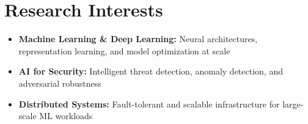 \documentclass[a4paper,10pt]{article}
\begin{document}
\section{Research Interests}
\begin{itemize}
    \item \textbf{Machine Learning \& Deep Learning:} Neural architectures, representation learning, and model optimization at scale
    \item \textbf{AI for Security:} Intelligent threat detection, anomaly detection, and adversarial robustness
    \item \textbf{Distributed Systems:} Fault-tolerant and scalable infrastructure for large-scale ML workloads
\end{itemize}
\end{document}
